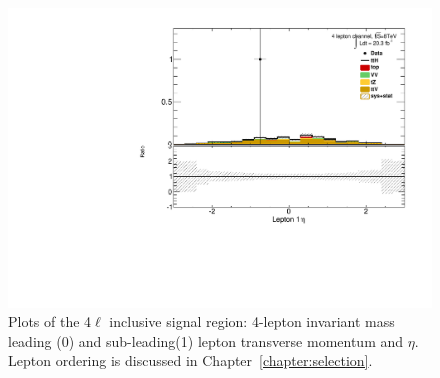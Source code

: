 \begin{figure}[!htbp]
\begin{minipage}[h]{0.5\textwidth}
    \centering \includegraphics[width=\textwidth]{figs/results/plotCand_4lep_Lep1Eta}
  \end{minipage}\hfill
  \begin{minipage}[h]{0.5\textwidth}
    
  \end{minipage}\hfill

  \caption{Plots of the 4$\ell$ inclusive signal region: 4-lepton invariant mass leading (0) and sub-leading(1) lepton transverse momentum and $\eta$. Lepton ordering is discussed in Chapter~\ref{chapter:selection}.} 
\label{figure:results_4l_mass}
\end{figure} 


